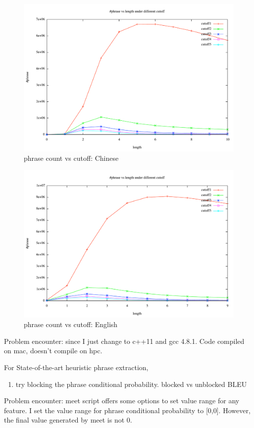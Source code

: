 \documentclass[11pt, letterpaper]{article}   	%
\begin{document}
\begin{figure}[p]
\centering
\includegraphics[width=1.0\textwidth]{phrase-count-chinese.pdf}
\caption{phrase count vs cutoff: Chinese}
\label{fig:phrase-count-chinese}
\end{figure}

\begin{figure}[p]
\centering
\includegraphics[width=1.0\textwidth]{phrase-count-english.pdf}
\caption{phrase count vs cutoff: English}
\label{fig:phrase-count-english}
\end{figure}

Problem encounter: since I just change to c++11 and gcc 4.8.1. Code compiled on mac, doesn't compile on hpc. 

For State-of-the-art heuristic phrase extraction, 
\begin{enumerate}
\item try blocking the phrase conditional probability.
blocked vs unblocked
BLEU
\end{enumerate}
Problem encounter: meet script offers some options to set value range for any feature. I set the value range for phrase conditional probability to [0,0]. However, the final value generated by meet is not 0.



\end{document}
